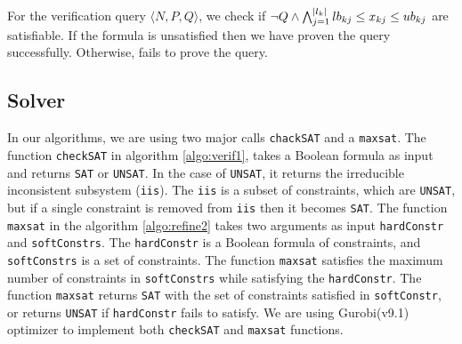 For the verification query $\langle N, P, Q \rangle$, we check if
$\lnot Q \land \bigwedge_{j=1}^{|l_k|}lb_{kj} \leq x_{kj} \leq ub_{kj}$
are satisfiable.
%
If the formula is unsatisfied then we have proven the query successfully.
Otherwise, \deeppoly fails to prove the query.




\subsection{Solver}
\label{sec:solver}


In our algorithms, we are using two major calls \texttt{chackSAT} and a \texttt{maxsat}.
The function \texttt{checkSAT} in algorithm \ref{algo:verif1}, 
takes a Boolean formula as input and returns \texttt{SAT} or \texttt{UNSAT}. 
In the case of \texttt{UNSAT}, it returns the irreducible inconsistent subsystem (\texttt{iis}). 
The \texttt{iis} is a subset of constraints, which are \texttt{UNSAT}, 
but if a single constraint is removed from \texttt{iis} then it becomes \texttt{SAT}.
The function \texttt{maxsat} in the algorithm \ref{algo:refine2} takes
two arguments as input \texttt{hardConstr} and \texttt{softConstrs}. 
The \texttt{hardConstr} is a Boolean formula of constraints,
and \texttt{softConstrs} is a set of constraints. 
The function \texttt{maxsat} satisfies the maximum number of constraints
in \texttt{softConstrs} while satisfying the \texttt{hardConstr}. 
The function \texttt{maxsat} returns \texttt{SAT} with the set of
constraints satisfied in \texttt{softConstr}, or returns
\texttt{UNSAT} if \texttt{hardConstr} fails to satisfy.
We are using Gurobi(v9.1)~\cite{gurobioptimizer} optimizer to implement 
both \texttt{checkSAT} and \texttt{maxsat} functions. 





